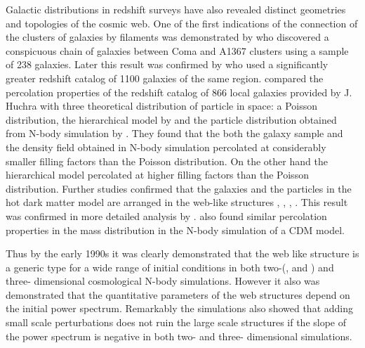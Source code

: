 Galactic distributions in redshift surveys have also revealed distinct geometries and topologies of the cosmic web. One of the first indications of the connection of the clusters of galaxies by filaments was demonstrated by \cite{Gregory1978} who discovered a conspicuous chain of galaxies between Coma and A1367 clusters using a sample of 238 galaxies. Later  this result was confirmed by \cite{Lapparent1986} who used a significantly greater redshift catalog of 1100 galaxies of the same region. \cite{Zeldovich1982} compared the percolation properties of the redshift catalog of 866 local galaxies provided by J. Huchra with three theoretical distribution of particle in space: a Poisson distribution, the  hierarchical model by \cite{Soneira1978} and the particle distribution obtained from N-body simulation by \cite{Klypin1983a}.  They found that the both the galaxy sample and the density field obtained in N-body simulation percolated at considerably smaller filling factors  than  the Poisson distribution. On the other hand the  hierarchical model percolated at higher filling factors  than  the Poisson distribution. Further studies confirmed that the galaxies and the particles in the hot dark matter  model are arranged in the web-like structures \cite{Zeldovich1982}, \cite{Shandarin1983}, \cite{Shandarin1983b}, \cite{Shandarin1984}. This result was confirmed in more detailed analysis by \cite{Einasto1984}. \cite{Melott1983b} also found similar percolation properties in the mass distribution in the N-body simulation of a CDM model.
 
Thus by the  early 1990s it was clearly demonstrated that the web like structure is a generic type for a wide range of initial conditions in both two-(\citealt{Doroshkevich1989}, \citealt{Melott1990} and \citealt{Beacom1991}) and three- dimensional \citep{Melott1993} cosmological N-body simulations. However it also was demonstrated that the quantitative parameters of the web structures depend on the initial power spectrum. Remarkably the simulations also showed that  adding small scale perturbations does not ruin the large scale structures if the slope of the power spectrum is negative in both two- and three- dimensional simulations.

